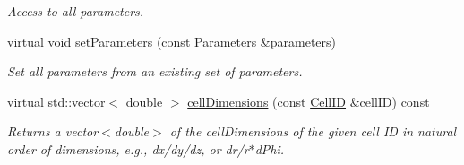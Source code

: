 \begin{DoxyCompactItemize}
\begin{DoxyCompactList}\small\item\em Access to all parameters. \item\end{DoxyCompactList}\item 
virtual void \hyperlink{class_d_d4hep_1_1_d_d_segmentation_1_1_segmentation_af02e320c944cc14b394f1014a8538cfa}{setParameters} (const \hyperlink{namespace_d_d4hep_1_1_d_d_segmentation_af38026430ca0e1ef64acdfc898f5dd3d}{Parameters} \&parameters)
\begin{DoxyCompactList}\small\item\em Set all parameters from an existing set of parameters. \item\end{DoxyCompactList}\item 
virtual std::vector$<$ double $>$ \hyperlink{class_d_d4hep_1_1_d_d_segmentation_1_1_segmentation_a9710f4942d7f6b52ae5342652e17c88d}{cellDimensions} (const \hyperlink{namespace_d_d4hep_1_1_d_d_segmentation_ac7af071d85cb48820914434a07e21ba1}{CellID} \&cellID) const 
\begin{DoxyCompactList}\small\item\em Returns a vector$<$double$>$ of the cellDimensions of the given cell ID in natural order of dimensions, e.g., dx/dy/dz, or dr/r$\ast$dPhi. \item\end{DoxyCompactList}\end{DoxyCompactItemize}
